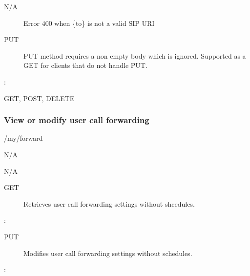 \documentclass[letterpaper,10pt,english]{sphinxmanual}
\begin{document}
 N/A
\begin{description}
\item[{}] \leavevmode
Error 400 when \{to\} is not a valid SIP URI

\item[{ PUT}] \leavevmode
PUT method requires a non empty body which is ignored. Supported as a GET for clients that do not handle PUT.

\end{description}

:

\begin{sphinxVerbatim}[commandchars=\\\{\}]
\end{sphinxVerbatim}

 GET, POST, DELETE


\subsubsection{View or modify user call forwarding}
\label{\detokenize{restapi:view-or-modify-user-call-forwarding}}
 /my/forward

 N/A

 N/A
\begin{description}
\item[{ GET}] \leavevmode
Retrieves user call forwarding settings without shcedules.

\end{description}

:

\begin{sphinxVerbatim}[commandchars=\\\{\}]
\end{sphinxVerbatim}
\begin{description}
\item[{ PUT}] \leavevmode
Modifies user call forwarding settings without schedules.

\end{description}

:
\end{document}
